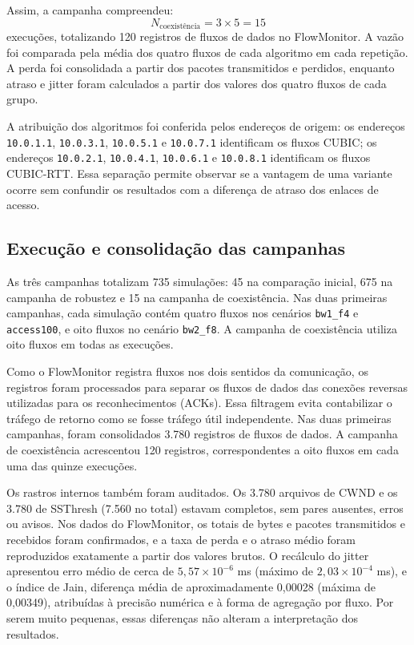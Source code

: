 Assim, a campanha compreendeu:
\begin{equation}
N_{\text{coexistência}} = 3 \times 5 = 15
\end{equation}
execuções, totalizando 120 registros de fluxos de dados no FlowMonitor. A vazão foi comparada pela média dos quatro fluxos de cada algoritmo em cada repetição. A perda foi consolidada a partir dos pacotes transmitidos e perdidos, enquanto atraso e jitter foram calculados a partir dos valores dos quatro fluxos de cada grupo.

A atribuição dos algoritmos foi conferida pelos endereços de origem: os endereços \texttt{10.0.1.1}, \texttt{10.0.3.1}, \texttt{10.0.5.1} e \texttt{10.0.7.1} identificam os fluxos CUBIC; os endereços \texttt{10.0.2.1}, \texttt{10.0.4.1}, \texttt{10.0.6.1} e \texttt{10.0.8.1} identificam os fluxos CUBIC-RTT. Essa separação permite observar se a vantagem de uma variante ocorre sem confundir os resultados com a diferença de atraso dos enlaces de acesso.

\subsection{Execução e consolidação das campanhas}

As três campanhas totalizam 735 simulações: 45 na comparação inicial, 675 na campanha de robustez e 15 na campanha de coexistência. Nas duas primeiras campanhas, cada simulação contém quatro fluxos nos cenários \texttt{bw1\_f4} e \texttt{access100}, e oito fluxos no cenário \texttt{bw2\_f8}. A campanha de coexistência utiliza oito fluxos em todas as execuções.

Como o FlowMonitor registra fluxos nos dois sentidos da comunicação, os registros foram processados para separar os fluxos de dados das conexões reversas utilizadas para os reconhecimentos (ACKs). Essa filtragem evita contabilizar o tráfego de retorno como se fosse tráfego útil independente. Nas duas primeiras campanhas, foram consolidados 3.780 registros de fluxos de dados. A campanha de coexistência acrescentou 120 registros, correspondentes a oito fluxos em cada uma das quinze execuções.

Os rastros internos também foram auditados. Os 3.780 arquivos de CWND e os 3.780 de SSThresh (7.560 no total) estavam completos, sem pares ausentes, erros ou avisos. Nos dados do FlowMonitor, os totais de bytes e pacotes transmitidos e recebidos foram confirmados, e a taxa de perda e o atraso médio foram reproduzidos exatamente a partir dos valores brutos. O recálculo do jitter apresentou erro médio de cerca de $5{,}57\times10^{-6}$ ms (máximo de $2{,}03\times10^{-4}$ ms), e o índice de Jain, diferença média de aproximadamente 0,00028 (máxima de 0,00349), atribuídas à precisão numérica e à forma de agregação por fluxo. Por serem muito pequenas, essas diferenças não alteram a interpretação dos resultados.

